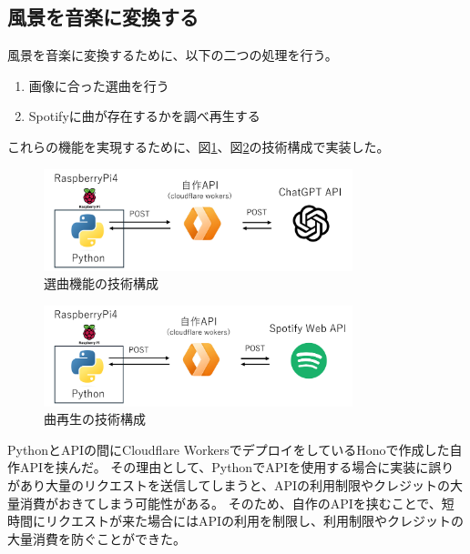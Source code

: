 \subsection{風景を音楽に変換する}
風景を音楽に変換するために、以下の二つの処理を行う。
\begin{enumerate}
  \item 画像に合った選曲を行う
  \item Spotifyに曲が存在するかを調べ再生する
\end{enumerate}
これらの機能を実現するために、図\ref{fig:image-to-select-music}、図\ref{fig:music-play}の技術構成で実装した。
\begin{figure}[h]
  \centering
  \includegraphics[width=0.8\textwidth]{pages/report/images/image-to-select-music.png}
  \caption{選曲機能の技術構成}
  \label{fig:image-to-select-music}
\end{figure}
\begin{figure}[h]
  \centering
  \includegraphics[width=0.8\textwidth]{pages/report/images/music-play.png}
  \caption{曲再生の技術構成}
  \label{fig:music-play}
\end{figure}
PythonとAPIの間にCloudflare WorkersでデプロイをしているHonoで作成した自作APIを挟んだ。
その理由として、PythonでAPIを使用する場合に実装に誤りがあり大量のリクエストを送信してしまうと、APIの利用制限やクレジットの大量消費がおきてしまう可能性がある。
そのため、自作のAPIを挟むことで、短時間にリクエストが来た場合にはAPIの利用を制限し、利用制限やクレジットの大量消費を防ぐことができた。

